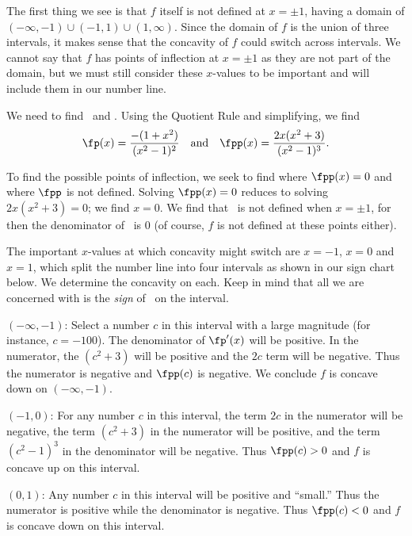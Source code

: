 {The first thing we see is that $f$ itself is not defined at $x=\pm1$, having a domain of $(-\infty,-1)\cup(-1,1)\cup(1,\infty)$. Since the domain of $f$ is the union of three intervals, it makes sense that the concavity of $f$ could switch across intervals. We cannot say that $f$ has points of inflection at $x=\pm1$ as they are not part of the domain, but we must still consider these $x$-values to be important and will include them in our number line.

We need to find \fp\ and \fpp. Using the Quotient Rule and simplifying, we find
\[
\fp(x)=\frac{-(1+x^2)}{(x^2-1)^2}
\quad \text{and}\quad
\fpp(x) = \frac{2x(x^2+3)}{(x^2-1)^3}.
\]

To find the possible points of inflection, we seek to find where $\fpp(x)=0$ and where $\fpp$ is not defined. Solving $\fpp(x)=0$ reduces to solving $2x(x^2+3)=0$; we find $x=0$.  We find that \fpp\ is not defined when $x=\pm 1$, for then the denominator of \fpp\ is 0 (of course, $f$ is not defined at these points either).

The important $x$-values at which concavity might switch are $x=-1$, $x=0$ and $x=1$, which  split the number line into four intervals as shown in our sign chart below. We determine the concavity on each. Keep in mind that all we are concerned with is the \textit{sign} of \fpp\ on the interval.\bigskip

\iflatexml\begin{description}\else\begin{description}[leftmargin=0pt]\fi
\item[Interval 1,] $(-\infty,-1)$: Select a number $c$ in this interval with a large magnitude (for instance, $c=-100$). The denominator of $\fp'(x)$ will be positive. In the numerator, the $(c^2+3)$ will be positive and the $2c$ term will be negative. Thus the numerator is negative and $\fpp(c)$ is negative. We conclude $f$ is concave down on $(-\infty,-1)$.

\item[Interval 2,] $(-1,0)$: For any number $c$ in this interval, the term $2c$ in the numerator will be negative, the term $(c^2+3)$ in the numerator will be positive, and the term $(c^2-1)^3$ in the denominator will be negative. Thus $\fpp(c)>0$ and $f$ is concave up on this interval.

\item[Interval 3,] $(0,1)$: Any number $c$ in this interval will be positive and ``small.'' Thus the numerator is positive while the denominator is negative. Thus $\fpp(c)<0$ and $f$ is concave down on this interval.


\end{description}
\end{description}}
